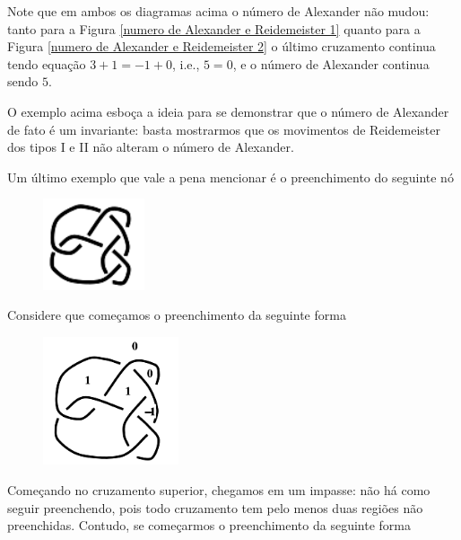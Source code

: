 \documentclass[a4paper,portuguese,11pt,twoside, leqno]{book}
\theoremstyle{definition}
\begin{document}
	\par\vspace{0.3cm} Note que em ambos os diagramas acima o número de Alexander não mudou: tanto para a Figura \eqref{numero de Alexander e Reidemeister 1} quanto para a Figura \eqref{numero de Alexander e Reidemeister 2} o último cruzamento continua tendo equação $3+1=-1+0$, i.e., $5=0$, e o número de Alexander continua sendo $5$.
	\par\vspace{0.3cm} O exemplo acima esboça a ideia para se demonstrar que o número de Alexander de fato é um invariante: basta mostrarmos que os movimentos de Reidemeister dos tipos I e II não alteram o número de Alexander.
	\par\vspace{0.3cm} Um último exemplo que vale a pena mencionar é o preenchimento do seguinte nó
	\begin{figure}[H]
		\begin{center}
			\includegraphics[width=3cm]{Images/no_exemplo_travado.png}
		\end{center}
	\end{figure}
	\par\vspace{0.3cm} Considere que começamos o preenchimento da seguinte forma
	\begin{figure}[H]
		\begin{center}
			\includegraphics[width=4cm]{Images/no_preenchimento_incompleto.png}
		\end{center}
	\end{figure}
	\par\vspace{0.3cm} Começando no cruzamento superior, chegamos em um impasse: não há como seguir preenchendo, pois todo cruzamento tem pelo menos duas regiões não preenchidas. Contudo, se começarmos o preenchimento da seguinte forma
\end{document}
